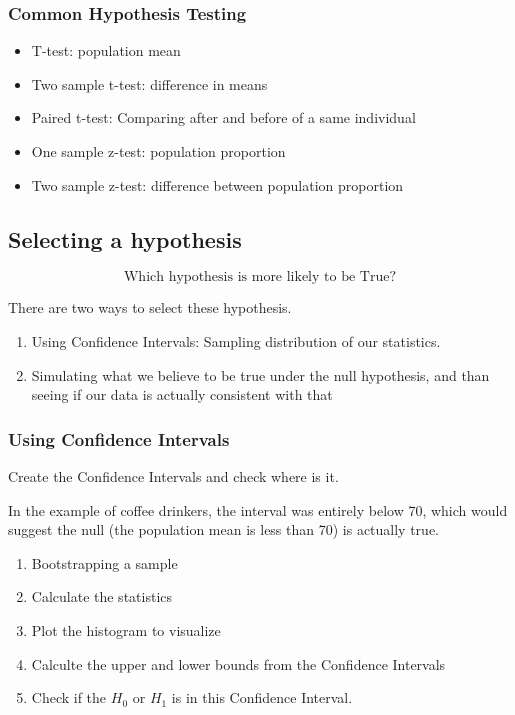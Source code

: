 \documentclass[]{book}
\providecommand{\tightlist}{%
  \setlength{\itemsep}{0pt}\setlength{\parskip}{0pt}}
\begin{document}
\subsubsection{Common Hypothesis
Testing}\label{common-hypothesis-testing}

\begin{itemize}
\tightlist
\item
  T-test: population mean
\item
  Two sample t-test: difference in means
\item
  Paired t-test: Comparing after and before of a same individual
\item
  One sample z-test: population proportion
\item
  Two sample z-test: difference between population proportion
\end{itemize}

\subsection{Selecting a hypothesis}\label{selecting-a-hypothesis}

\[ \text{Which hypothesis is more likely to be True?} \]

There are two ways to select these hypothesis.

\begin{enumerate}
\def\labelenumi{\arabic{enumi}.}
\tightlist
\item
  Using Confidence Intervals: Sampling distribution of our statistics.
\item
  Simulating what we believe to be true under the null hypothesis, and
  than seeing if our data is actually consistent with that
\end{enumerate}

\subsubsection{Using Confidence
Intervals}\label{using-confidence-intervals}

Create the Confidence Intervals and check where is it.

In the example of coffee drinkers, the interval was entirely below 70,
which would suggest the null (the population mean is less than 70) is
actually true.

\begin{enumerate}
\def\labelenumi{\arabic{enumi}.}
\tightlist
\item
  Bootstrapping a sample
\item
  Calculate the statistics
\item
  Plot the histogram to visualize
\item
  Calculte the upper and lower bounds from the Confidence Intervals
\item
  Check if the \(H_0\) or \(H_1\) is in this Confidence Interval.
\end{enumerate}
\end{document}
